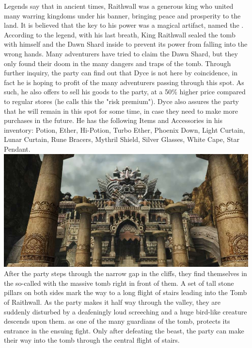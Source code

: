 Legends say that in ancient times, Raithwall was a generous king who united many warring kingdoms under his banner, bringing peace and prosperity to the land.
It is believed that the key to his power was a magical artifact, named the .
According to the legend, with his last breath, King Raithwall sealed the tomb with himself and the Dawn Shard inside to prevent its power from falling into the wrong hands.
Many adventurers have tried to claim the Dawn Shard, but they only found their doom in the many dangers and traps of the tomb.
Through further inquiry, the party can find out that Dyce is not here by coincidence, in fact he is hoping to profit of the many adventurers passing through this spot.
As such, he also offers to sell his goods to the party, at a 50\% higher price compared to regular stores (he calls this the "risk premium").
Dyce also assures the party that he will remain in this spot for some time, in case they need to make more purchases in the future.
He has the following Items and Accessories in his inventory: Potion, Ether, Hi-Potion, Turbo Ether, Phoenix Down, Light Curtain, Lunar Curtain, Rune Bracers, Mythril Shield, Silver Glasses, White Cape, Star Pendant.
%
\vfill
%
\includegraphics[width=\columnwidth]{./art/tombofraithwall/tomb2.jpg}
%
\vfill
%
After the party steps through the narrow gap in the cliffs, they find themselves in the so-called  with the massive tomb right in front of them.
A set of tall stone pillars on both sides mark the way to a long flight of stairs leading into the Tomb of Raithwall.
As the party makes it half way through the valley, they are suddenly disturbed by a deafeningly loud screeching and a huge bird-like creature descends upon them.
 as one of the many guardians of the tomb, protects its entrance in the ensuing fight.
Only after defeating the beast, the party can make their way into the tomb through the central flight of stairs.
%
\vfill
%
